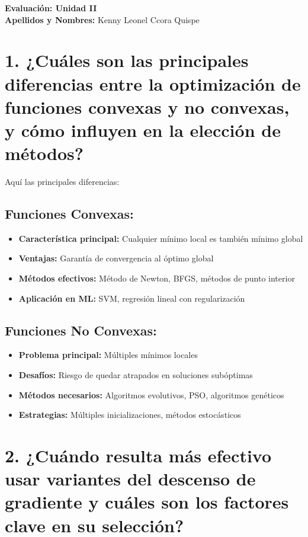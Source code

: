 \documentclass[12pt,a4paper]{article}
\begin{document}
\begin{center}
\textbf{\Large Evaluación: Unidad II}\\
\vspace{0.5cm}
\textbf{Apellidos y Nombres:} Kenny Leonel Ccora Quispe
\end{center}

\vspace{1cm}

\section*{1. ¿Cuáles son las principales diferencias entre la optimización de funciones convexas y no convexas, y cómo influyen en la elección de métodos?}

Aquí las principales diferencias:

\subsection*{Funciones Convexas:}
\begin{itemize}[leftmargin=1.5cm]
    \item \textbf{Característica principal:} Cualquier mínimo local es también mínimo global
    \item \textbf{Ventajas:} Garantía de convergencia al óptimo global
    \item \textbf{Métodos efectivos:} Método de Newton, BFGS, métodos de punto interior
    \item \textbf{Aplicación en ML:} SVM, regresión lineal con regularización
\end{itemize}

\subsection*{Funciones No Convexas:}
\begin{itemize}[leftmargin=1.5cm]
    \item \textbf{Problema principal:} Múltiples mínimos locales
    \item \textbf{Desafíos:} Riesgo de quedar atrapados en soluciones subóptimas
    \item \textbf{Métodos necesarios:} Algoritmos evolutivos, PSO, algoritmos genéticos
    \item \textbf{Estrategias:} Múltiples inicializaciones, métodos estocásticos
\end{itemize}

\section*{2. ¿Cuándo resulta más efectivo usar variantes del descenso de gradiente y cuáles son los factores clave en su selección?}
\end{document}
